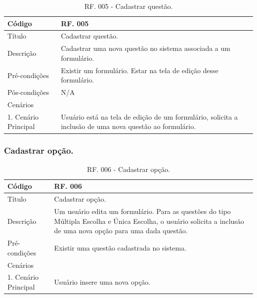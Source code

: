 \documentclass[11pt]{article}
\begin{document}
        \begin{table}[h]
          \begin{center}
            \begin{tabular}{ | p{5cm} | p{10cm} | }
              \hline
              Código\cellcolor{gray} & RF. 005\cellcolor{gray} \\
              \hline
              Título & Cadastrar questão. \\
              \hline
              Descrição & Cadastrar uma nova questão no sistema associada a um formulário. \\
              \hline
              Pré-condições & Existir um formulário. Estar na tela de edição desse formulário. \\
              \hline
              Pós-condições & N/A \\
              \hline
              Cenários &   \\
              \hline
              1.  Cenário Principal & Usuário está na tela de edição de um formulário, solicita a inclusão de uma nova questão ao formulário. \\
              \hline
            \end{tabular}
            \caption{RF. 005 - Cadastrar questão.}
          \end{center}
        \end{table}

      \subsubsection{Cadastrar opção.}

        \begin{table}[h]
          \begin{center}
            \begin{tabular}{ | p{5cm} | p{10cm} | }
              \hline
              Código\cellcolor{gray} & RF. 006\cellcolor{gray} \\
              \hline
              Título & Cadastrar opção. \\
              \hline
              Descrição & Um usuário edita um formulário. Para as questões do tipo Múltipla Escolha e Única Escolha, o usuário solicita a inclusão de uma nova opção para uma dada questão. \\
              \hline
              Pré-condições & Existir uma questão cadastrada no sistema. \\
              \hline
              Cenários &   \\
              \hline
              1.  Cenário Principal & Usuário insere uma nova opção. \\
              \hline
            \end{tabular}
            \caption{RF. 006 - Cadastrar opção.}
          \end{center}
        \end{table}
\end{document}
